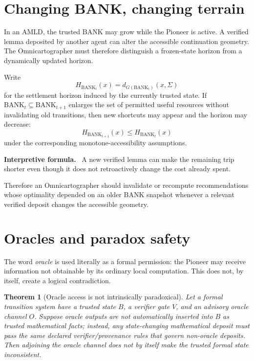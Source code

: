 \documentclass[11pt]{article}
\newtheorem{theorem}{Theorem}[section]
\theoremstyle{definition}
\theoremstyle{remark}
\newcommand{\BANK}{\mathrm{BANK}}
\newcommand{\Sett}{\Sigma}
\newenvironment{interpretiveformula}{%
  \begin{center}\begin{minipage}{0.92\textwidth}\small
  \textbf{Interpretive formula.}\ }{\end{minipage}\end{center}}
\begin{document}
\section{Changing BANK, changing terrain}
In an AMLD, the trusted $\BANK$ may grow while the Pioneer is active. A verified lemma deposited by another agent can alter the accessible continuation geometry. The Omnicartographer must therefore distinguish a frozen-state horizon from a dynamically updated horizon.

Write
\[
H_{\BANK_t}(x)=d_{G(\BANK_t)}(x,\Sett)
\]
for the settlement horizon induced by the currently trusted state. If $\BANK_t\subseteq\BANK_{t+1}$ enlarges the set of permitted useful resources without invalidating old transitions, then new shortcuts may appear and the horizon may decrease:
\[
H_{\BANK_{t+1}}(x)\le H_{\BANK_t}(x)
\]
under the corresponding monotone-accessibility assumptions.

\begin{interpretiveformula}
A new verified lemma can make the remaining trip shorter even though it does not retroactively change the cost already spent.
\end{interpretiveformula}

Therefore an Omnicartographer should invalidate or recompute recommendations whose optimality depended on an older $\BANK$ snapshot whenever a relevant verified deposit changes the accessible geometry.

\section{Oracles and paradox safety}
The word \emph{oracle} is used literally as a formal permission: the Pioneer may receive information not obtainable by its ordinary local computation. This does not, by itself, create a logical contradiction.

\begin{theorem}[Oracle access is not intrinsically paradoxical]\label{thm:oracle-safe}
Let a formal transition system have a trusted state $B$, a verifier gate $V$, and an advisory oracle channel $O$. Suppose oracle outputs are not automatically inserted into $B$ as trusted mathematical facts; instead, any state-changing mathematical deposit must pass the same declared verifier/provenance rules that govern non-oracle deposits. Then adjoining the oracle channel does not by itself make the trusted formal state inconsistent.
\end{theorem}
\end{document}
